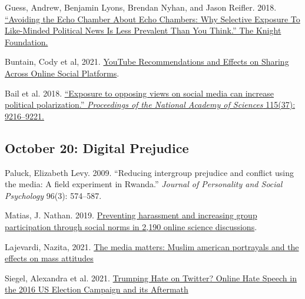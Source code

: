 \vspace{-.1in}\documentclass[11pt]{article}
\begin{document}
\noindent Guess, Andrew, Benjamin Lyons, Brendan Nyhan, and Jason Reifler. 2018. \href{https://kf-site-production.s3.amazonaws.com/media_elements/files/000/000/133/original/Topos_KF_White-Paper_Nyhan_V1.pdf}{``Avoiding the Echo Chamber About Echo Chambers: Why Selective Exposure To Like-Minded Political News Is Less Prevalent Than You Think.'' The Knight Foundation.}


\noindent Buntain, Cody et al, 2021. \href{https://dl.acm.org/doi/10.1145/3449085}{YouTube Recommendations and Effects on Sharing Across Online Social Platforms}.
	
\noindent Bail et al. 2018. \href{https://www.pnas.org/content/115/37/9216}{``Exposure to opposing views on social media can increase political polarization.'' \emph{Proceedings of the National Academy of Sciences} 115(37): 9216--9221.}	
	




\subsection*{October 20: Digital Prejudice }

Paluck, Elizabeth Levy. 2009. ``Reducing intergroup prejudice and conflict using the media: A field experiment in Rwanda.'' \emph{Journal of Personality and Social Psychology} 96(3): 574--587.

\noindent Matias, J. Nathan. 2019. \href{https://www.pnas.org/content/pnas/116/20/9785.full.pdf}{Preventing harassment and increasing group participation through social norms in 2,190 online	science discussions}.

\noindent Lajevardi, Nazita, 2021. \href{https://www.journals.uchicago.edu/doi/full/10.1086/711300?casa_token=wITxV2WJeaQAAAAA:1wco3QZFwUnMq6EOzYON4LXw2XZUU-By0eeehfQq8QuDzgcUuQW93THNT8o7USkGF81ypdGHcHA}{The media matters: Muslim american portrayals and the effects on mass attitudes}

\noindent Siegel, Alexandra et al. 2021. \href{https://alexandra-siegel.com/wp-content/uploads/2019/08/qjps_election_hatespeech_RR.pdf}{Trumping Hate on Twitter? Online Hate Speech in the 2016 US Election Campaign and its Aftermath}
\end{document}

